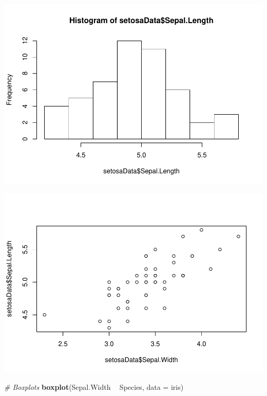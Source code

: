 \documentclass[
]{book}
\newenvironment{Shaded}{\begin{snugshade}}{\end{snugshade}}
\newcommand{\CommentTok}[1]{\textcolor[rgb]{0.56,0.35,0.01}{\textit{#1}}}
\newcommand{\DataTypeTok}[1]{\textcolor[rgb]{0.13,0.29,0.53}{#1}}
\newcommand{\KeywordTok}[1]{\textcolor[rgb]{0.13,0.29,0.53}{\textbf{#1}}}
\newcommand{\NormalTok}[1]{#1}
\newcommand{\OperatorTok}[1]{\textcolor[rgb]{0.81,0.36,0.00}{\textbf{#1}}}
\newcommand{\StringTok}[1]{\textcolor[rgb]{0.31,0.60,0.02}{#1}}
\begin{document}
\includegraphics{worstr_files/figure-latex/unnamed-chunk-53-1.pdf}

\begin{Shaded}
\end{Shaded}

\includegraphics{worstr_files/figure-latex/unnamed-chunk-53-2.pdf}

\begin{Shaded}
\begin{Highlighting}[]
\CommentTok{# Boxplots}
\KeywordTok{boxplot}\NormalTok{(Sepal.Width }\OperatorTok{~}\StringTok{ }\NormalTok{Species, }\DataTypeTok{data =}\NormalTok{ iris)}
\end{Highlighting}
\end{Shaded}
\end{document}
